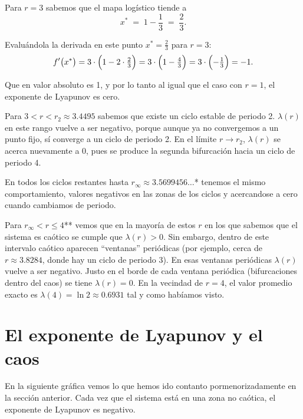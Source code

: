 \documentclass[
  11pt,
  a4paper,
  DIV=11,
  numbers=noendperiod]{scrreprt}
\begin{document}
Para \(r = 3\) sabemos que el mapa logístico tiende a \[
   x^* \;=\; 1 - \frac{1}{3} \;=\; \frac{2}{3}.
   \]

Evaluándola la derivada en este punto \(x^* = \tfrac{2}{3}\) para
\(r = 3\): \[
   f'\bigl(x^*\bigr) 
   = 3 \cdot \Bigl(1 - 2 \cdot \tfrac{2}{3}\Bigr) 
   = 3 \cdot \Bigl(1 - \tfrac{4}{3}\Bigr) 
   = 3 \cdot \Bigl(-\tfrac{1}{3}\Bigr) 
   = -1.
   \]

Que en valor absoluto es 1, y por lo tanto al igual que el caso con
\(r=1\), el exponente de Lyapunov es cero.

Para \textbf{\(3 < r < r_2 \approx 3.4495\)} sabemos que existe un ciclo
estable de periodo 2. \(\lambda(r)\) en este rango vuelve a ser
negativo, porque aunque ya no convergemos a un punto fijo, sí converge a
un ciclo de periodo 2. En el límite \(r \to r_2\), \(\lambda(r)\) se
acerca nuevamente a 0, pues se produce la segunda bifurcación hacia un
ciclo de periodo 4.

En todos los ciclos restantes hasta \(r_\infty \approx 3.5699456\dots\)*
tenemos el mismo comportamiento, valores negativos en las zonas de los
ciclos y acercandose a cero cuando cambiamos de periodo.

Para \(r_\infty < r \le 4\)** vemos que en la mayoría de estos \(r\) en
los que sabemos que el sistema es caótico se cumple que
\(\lambda(r) > 0\). Sin embargo, dentro de este intervalo caótico
aparecen ``ventanas'' periódicas (por ejemplo, cerca de
\(r\approx 3.8284\), donde hay un ciclo de periodo 3). En esas ventanas
periódicas \(\lambda(r)\) vuelve a ser negativo. Justo en el borde de
cada ventana periódica (bifurcaciones dentro del caos) se tiene
\(\lambda(r)=0\). En la vecindad de \(r = 4\), el valor promedio exacto
es \(\lambda(4) = \ln 2 \approx 0.6931\) tal y como habíamos visto.

\chapter{El exponente de Lyapunov y el
caos}\label{el-exponente-de-lyapunov-y-el-caos}

En la siguiente gráfica vemos lo que hemos ido contanto
pormenorizadamente en la sección anterior. Cada vez que el sistema está
en una zona no caótica, el exponente de Lyapunov es negativo.
\end{document}
